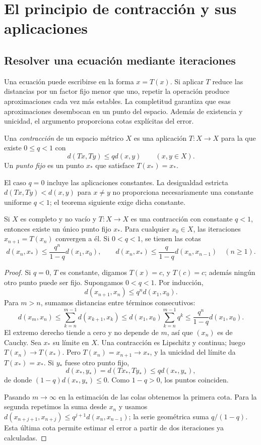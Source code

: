 \chapter{El principio de contracción y sus aplicaciones}\label{chap:11}
\section{Resolver una ecuación mediante iteraciones}
Una ecuación puede escribirse en la forma $x=T(x)$. Si aplicar $T$ reduce las distancias por un factor fijo menor que uno, repetir la operación produce aproximaciones cada vez más estables. La completitud garantiza que esas aproximaciones desembocan en un punto del espacio. Además de existencia y unicidad, el argumento proporciona cotas explícitas del error.

\begin{definicion}
Una \emph{contracción} de un espacio métrico $X$ es una aplicación $T:X\to X$ para la que existe $0\leq q<1$ con
\[
 d(Tx,Ty)\leq qd(x,y)\qquad(x,y\in X).
\]
Un \emph{punto fijo} es un punto $x_*$ que satisface $T(x_*)=x_*$.
\end{definicion}
El caso $q=0$ incluye las aplicaciones constantes. La desigualdad estricta $d(Tx,Ty)<d(x,y)$ para $x\ne y$ no proporciona necesariamente una constante uniforme $q<1$; el teorema siguiente exige dicha constante.

\begin{teorema}\label{ch11:banach}
Si $X$ es completo y no vacío y $T:X\to X$ es una contracción con constante $q<1$, entonces existe un único punto fijo $x_*$. Para cualquier $x_0\in X$, las iteraciones $x_{n+1}=T(x_n)$ convergen a él. Si $0<q<1$, se tienen las cotas
\[
 d(x_n,x_*)\leq\frac{q^n}{1-q}d(x_1,x_0),
 \qquad d(x_n,x_*)\leq\frac{q}{1-q}d(x_n,x_{n-1})\quad(n\geq1).
\]
\end{teorema}
\begin{proof}
Si $q=0$, $T$ es constante, digamos $T(x)=c$, y $T(c)=c$; además ningún otro punto puede ser fijo. Supongamos $0<q<1$. Por inducción,
\[
 d(x_{n+1},x_n)\leq q^nd(x_1,x_0).
\]
Para $m>n$, sumamos distancias entre términos consecutivos:
\[
 d(x_m,x_n)\leq\sum_{k=n}^{m-1}d(x_{k+1},x_k)
 \leq d(x_1,x_0)\sum_{k=n}^{m-1}q^k
 \leq\frac{q^n}{1-q}d(x_1,x_0).
\]
El extremo derecho tiende a cero y no depende de $m$, así que $(x_n)$ es de Cauchy. Sea $x_*$ su límite en $X$. Una contracción es Lipschitz y continua; luego $T(x_n)\to T(x_*)$. Pero $T(x_n)=x_{n+1}\to x_*$, y la unicidad del límite da $T(x_*)=x_*$. Si $y_*$ fuese otro punto fijo,
\[
 d(x_*,y_*)=d(Tx_*,Ty_*)\leq qd(x_*,y_*),
\]
de donde $(1-q)d(x_*,y_*)\leq0$. Como $1-q>0$, los puntos coinciden.

Pasando $m\to\infty$ en la estimación de las colas obtenemos la primera cota. Para la segunda repetimos la suma desde $x_n$ y usamos $d(x_{n+j+1},x_{n+j})\leq q^{j+1}d(x_n,x_{n-1})$; la serie geométrica suma $q/(1-q)$. Esta última cota permite estimar el error a partir de dos iteraciones ya calculadas.
\end{proof}

